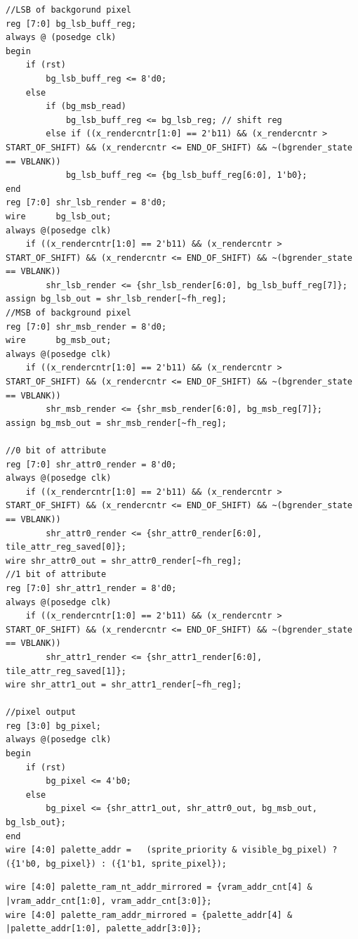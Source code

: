 \begin{lstlisting}[caption={Pixel adat feldolgozó SRL léptetőregiszterek}, label={code:SRL-shiftregs}, style=prettyverilog]
//LSB of backgorund pixel
reg [7:0] bg_lsb_buff_reg;
always @ (posedge clk) 
begin
	if (rst)
		bg_lsb_buff_reg <= 8'd0;
	else
		if (bg_msb_read)
			bg_lsb_buff_reg <= bg_lsb_reg; // shift reg
		else if ((x_rendercntr[1:0] == 2'b11) && (x_rendercntr > START_OF_SHIFT) && (x_rendercntr <= END_OF_SHIFT) && ~(bgrender_state == VBLANK))
			bg_lsb_buff_reg <= {bg_lsb_buff_reg[6:0], 1'b0}; 
end
reg [7:0] shr_lsb_render = 8'd0;
wire	  bg_lsb_out;  
always @(posedge clk) 
	if ((x_rendercntr[1:0] == 2'b11) && (x_rendercntr > START_OF_SHIFT) && (x_rendercntr <= END_OF_SHIFT) && ~(bgrender_state == VBLANK))
		shr_lsb_render <= {shr_lsb_render[6:0], bg_lsb_buff_reg[7]};
assign bg_lsb_out = shr_lsb_render[~fh_reg];
//MSB of background pixel
reg [7:0] shr_msb_render = 8'd0;
wire	  bg_msb_out;  
always @(posedge clk) 
	if ((x_rendercntr[1:0] == 2'b11) && (x_rendercntr > START_OF_SHIFT) && (x_rendercntr <= END_OF_SHIFT) && ~(bgrender_state == VBLANK))
		shr_msb_render <= {shr_msb_render[6:0], bg_msb_reg[7]};
assign bg_msb_out = shr_msb_render[~fh_reg];

//0 bit of attribute
reg [7:0] shr_attr0_render = 8'd0; 
always @(posedge clk) 
	if ((x_rendercntr[1:0] == 2'b11) && (x_rendercntr > START_OF_SHIFT) && (x_rendercntr <= END_OF_SHIFT) && ~(bgrender_state == VBLANK))
		shr_attr0_render <= {shr_attr0_render[6:0], tile_attr_reg_saved[0]};
wire shr_attr0_out = shr_attr0_render[~fh_reg];
//1 bit of attribute
reg [7:0] shr_attr1_render = 8'd0; 
always @(posedge clk) 
	if ((x_rendercntr[1:0] == 2'b11) && (x_rendercntr > START_OF_SHIFT) && (x_rendercntr <= END_OF_SHIFT) && ~(bgrender_state == VBLANK))
		shr_attr1_render <= {shr_attr1_render[6:0], tile_attr_reg_saved[1]};
wire shr_attr1_out = shr_attr1_render[~fh_reg];

//pixel output
reg [3:0] bg_pixel;
always @(posedge clk) 
begin
	if (rst)
		bg_pixel <= 4'b0;
	else
		bg_pixel <= {shr_attr1_out, shr_attr0_out, bg_msb_out, bg_lsb_out};		
end
wire [4:0] palette_addr = 	(sprite_priority & visible_bg_pixel) ? ({1'b0, bg_pixel}) : ({1'b1, sprite_pixel});\end{lstlisting}

\begin{lstlisting}[caption={A paletta címek tükrözése}, label={code:palette-mirroring}, style=prettyverilog]
wire [4:0] palette_ram_nt_addr_mirrored = {vram_addr_cnt[4] & |vram_addr_cnt[1:0], vram_addr_cnt[3:0]};									
wire [4:0] palette_ram_addr_mirrored = {palette_addr[4] & |palette_addr[1:0], palette_addr[3:0]};\end{lstlisting}

